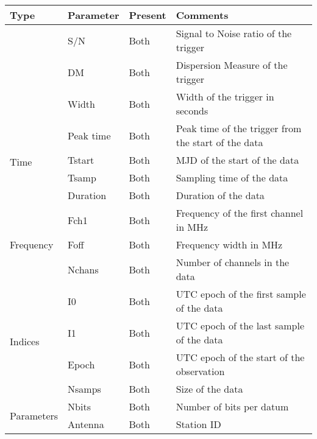 \begin{table}
	\label{tab:ubson}
	\begin{tabular}{llll}
		\toprule
		Type                        & Parameter   & Present & Comments                                               \\ \midrule
																& S/N         & Both    & Signal to Noise ratio of the trigger                   \\
																& DM          & Both    & Dispersion Measure of the trigger                      \\
																& Width       & Both    & Width of the trigger in seconds                        \\
		\multirow{4}{*}{Time}       & Peak time   & Both    & Peak time of the trigger from the start of the data    \\
																	& Tstart      & Both    & MJD of the start of the data                           \\
																	& Tsamp       & Both    & Sampling time of the data                              \\
																	& Duration    & Both    & Duration of the data                                   \\ \midrule
		\multirow{3}{*}{Frequency}  & Fch1        & Both    & Frequency of the first channel in MHz                  \\
																	& Foff        & Both    & Frequency width in MHz                                 \\
																	& Nchans      & Both    & Number of channels in the data                         \\ \midrule
		\multirow{4}{*}{Indices}    & I0          & Both    & UTC epoch of the first sample of the data              \\
																	& I1          & Both    & UTC epoch of the last sample of the data               \\
																	& Epoch       & Both    & UTC epoch of the start of the observation              \\
																	& Nsamps      & Both    & Size of the data                                       \\ \midrule
		\multirow{6}{*}{Parameters} & Nbits       & Both    & Number of bits per datum                               \\
																	& Antenna     & Both    & Station ID                                             \\

\end{tabular}
\end{table}
